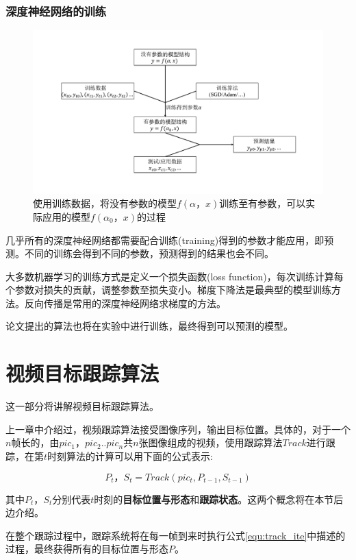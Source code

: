 \subsubsection{深度神经网络的训练}
\par
\begin{figure}[htbp!]
    \centering
    \includegraphics[width = 1.\textwidth]{chap/img/model_learning.pdf}
    \caption{使用训练数据，将没有参数的模型$f(\alpha，x)$训练至有参数，可以实际应用的模型$f(\alpha_0，x)$的过程}
    \label{fig:model_learning}
\end{figure}
几乎所有的深度神经网络都需要配合训练(training)得到的参数才能应用，即预测。不同的训练会得到不同的参数，预测得到的结果也会不同。
\par
大多数机器学习的训练方式是定义一个损失函数(loss function)，每次训练计算每个参数对损失的贡献，调整参数至损失变小。梯度下降法是最典型的模型训练方法。反向传播是常用的深度神经网络求梯度的方法。
\par
论文提出的算法也将在实验中进行训练，最终得到可以预测的模型。

\section{视频目标跟踪算法}
这一部分将讲解视频目标跟踪算法。
\par
上一章中介绍过，视频跟踪算法接受图像序列，输出目标位置。具体的，对于一个$n$帧长的，由$pic_1，pic_2..pic_n$共$n$张图像组成的视频，使用跟踪算法$Track$进行跟踪，在第$t$时刻算法的计算可以用下面的公式表示:
\par
\begin{equation}\label{equ:track_ite}  P_t，S_t=Track(pic_{t},P_{t-1},S_{t-1})  \end{equation}
\par
其中$P_t$，$S_t$分别代表$t$时刻的\textbf{目标位置与形态}和\textbf{跟踪状态}。这两个概念将在本节后边介绍。
\par
在整个跟踪过程中，跟踪系统将在每一帧到来时执行公式\ref{equ:track_ite}中描述的过程，最终获得所有的目标位置与形态$P$。
\par
